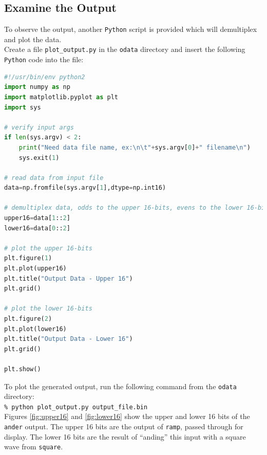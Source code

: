 \subsection{Examine the Output}
\label{example:output}
To observe the output, another \verb+Python+ script is provided which will demultiplex and plot the data.\\
\bstart
Create a file \verb+plot_output.py+ in the \verb+odata+ directory and insert the following \verb+Python+ code into the file:
\begin{lstlisting}[language=python]
#!/usr/bin/env python2
import numpy as np
import matplotlib.pyplot as plt
import sys

# verify input args
if len(sys.argv) < 2:
    print("Need data file name, ex:\n\t"+sys.argv[0]+" filename\n")
    sys.exit(1)

# read data from input file
data=np.fromfile(sys.argv[1],dtype=np.int16)

# demultiplex data, odds to the upper 16-bits, evens to the lower 16-bits
upper16=data[1::2]
lower16=data[0::2]

# plot the upper 16-bits
plt.figure(1)
plt.plot(upper16)
plt.title("Output Data - Upper 16")
plt.grid()

# plot the lower 16-bits
plt.figure(2)
plt.plot(lower16)
plt.title("Output Data - Lower 16")
plt.grid()

plt.show()
\end{lstlisting}
\bend
\bstart
To plot the generated output, run the following command from the \verb+odata+ directory:\\

\forceindent\verb+% python plot_output.py output_file.bin+\\
\bend
\bstart
Figures \ref{fig:upper16} and \ref{fig:lower16} show the upper and lower 16 bits of the \verb+ander+ output. The upper 16 bits are the output of \verb+ramp+, passed through for display. The lower 16 bits are the result of ``anding'' this input with a square wave from \verb+square+.\\

